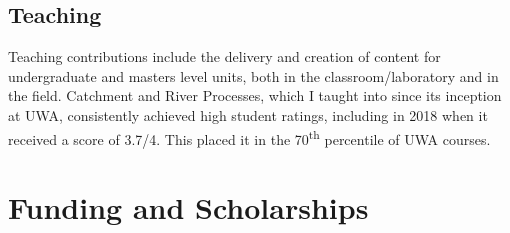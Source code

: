 \documentclass[11pt,a4paper,]{moderncv}
\begin{document}
\hypertarget{teaching}{%
\subsection{Teaching}\label{teaching}}

\nopagebreak

Teaching contributions include the delivery and creation of content for
undergraduate and masters level units, both in the classroom/laboratory
and in the field. Catchment and River Processes, which I taught into
since its inception at UWA, consistently achieved high student ratings,
including in 2018 when it received a score of 3.7/4. This placed it in
the 70\textsuperscript{th} percentile of UWA courses.

\hypertarget{funding-and-scholarships}{%
\section{Funding and Scholarships}\label{funding-and-scholarships}}
\end{document}
